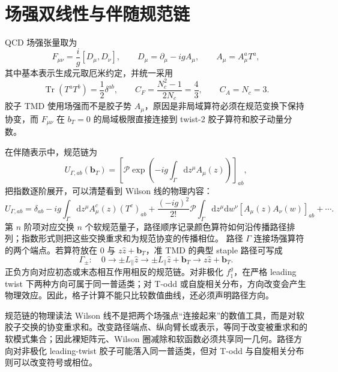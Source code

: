 \documentclass[UTF8,12pt,a4paper,twoside,openany]{ctexbook}
\newcommand{\dd}{\mathrm{d}}
\newcommand{\Tr}{\operatorname{Tr}}
\newcommand{\bT}{\boldsymbol b_T}
\begin{document}
\section{场强双线性与伴随规范链}

QCD 场强张量取为
\begin{equation}
  F_{\mu\nu}=\frac{i}{g}[D_\mu,D_\nu],
  \qquad
  D_\mu=\partial_\mu-igA_\mu,
  \qquad
  A_\mu=A_\mu^aT^a,
  \label{eq:fieldstrength}
\end{equation}
其中基本表示生成元取厄米约定，并统一采用
\begin{equation}
  \Tr(T^aT^b)=\frac{1}{2}\delta^{ab},
  \qquad
  C_F=\frac{N_c^2-1}{2N_c}=\frac{4}{3},
  \qquad
  C_A=N_c=3 .
  \label{eq:generatornormalization}
\end{equation}
胶子 TMD 使用场强而不是胶子势 \(A_\mu\)，原因是非局域算符必须在规范变换下保持协变，而 \(F_{\mu\nu}\) 在 \(b_T=0\) 的局域极限直接连接到 twist-2 胶子算符和胶子动量分数\cite{Collins2011,JiReview2021}。

在伴随表示中，规范链为
\begin{equation}
  U_{\Gamma,ab}(\bT)=\left[\mathcal P\exp\left(-ig\int_\Gamma \dd z^\mu A_\mu(z)\right)\right]_{ab},
  \label{eq:adjlink}
\end{equation}
把指数逐阶展开，可以清楚看到 Wilson 线的物理内容：
\begin{equation}
  U_{\Gamma,ab}
  =\delta_{ab}
  -ig\int_\Gamma \dd z^\mu A^c_\mu(z)(T^c)_{ab}
  +\frac{(-ig)^2}{2!}\mathcal P\int_\Gamma \dd z^\mu\dd w^\nu
  [A_\mu(z)A_\nu(w)]_{ab}
  +\cdots .
  \label{eq:adjlinkexpansion}
\end{equation}
第 \(n\) 阶项对应交换 \(n\) 个软规范量子，路径顺序记录颜色算符如何沿传播路径排列；指数形式则把这些交换重求和为规范协变的传播相位。
路径 \(\Gamma\) 连接场强算符的两个端点。若算符放在 \(0\) 与 \(z\hat z+\bT\)，准 TMD 的典型 staple 路径可写成
\begin{equation}
  \Gamma_\pm:\quad
  0\longrightarrow \pm L_\parallel\hat z
  \longrightarrow \pm L_\parallel\hat z+\bT
  \longrightarrow z\hat z+\bT .
  \label{eq:staplepath}
\end{equation}
正负方向对应初态或末态相互作用相反的规范链。对非极化 \(f_1^g\)，在严格 leading twist 下两种方向可属于同一普适类；对 T-odd 或自旋相关分布，方向改变会产生物理效应\cite{Collins2011,JiReview2021}。因此，格子计算不能只比较数值曲线，还必须声明路径方向。

\begin{physicalbox}{规范链的物理读法}
Wilson 线不是把两个场强点“连接起来”的数值工具，而是对软胶子交换的协变重求和。改变路径端点、纵向臂长或表示，等同于改变被重求和的软模式集合；因此裸矩阵元、Wilson 圈减除和软函数必须共享同一几何。路径方向对非极化 leading-twist 胶子可能落入同一普适类，但对 T-odd 与自旋相关分布则可以改变符号或相位。
\end{physicalbox}
\end{document}
